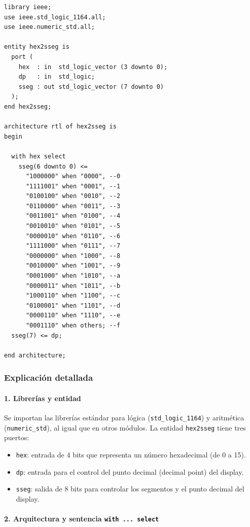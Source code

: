 \documentclass[a4paper,12pt]{article}
\begin{document}
\begin{lstlisting}[caption={Decodificador hexadecimal a 7 segmentos}, label={lst:hex2sseg}]
library ieee;
use ieee.std_logic_1164.all;
use ieee.numeric_std.all;

entity hex2sseg is
  port (
    hex  : in  std_logic_vector (3 downto 0);
    dp   : in  std_logic;
    sseg : out std_logic_vector (7 downto 0)
  );
end hex2sseg;

architecture rtl of hex2sseg is
begin

  with hex select
    sseg(6 downto 0) <=
      "1000000" when "0000", --0
      "1111001" when "0001", --1
      "0100100" when "0010", --2
      "0110000" when "0011", --3
      "0011001" when "0100", --4
      "0010010" when "0101", --5
      "0000010" when "0110", --6
      "1111000" when "0111", --7
      "0000000" when "1000", --8
      "0010000" when "1001", --9
      "0001000" when "1010", --a
      "0000011" when "1011", --b
      "1000110" when "1100", --c
      "0100001" when "1101", --d
      "0000110" when "1110", --e
      "0001110" when others; --f
  sseg(7) <= dp;

end architecture;
\end{lstlisting}

\subsubsection*{Explicación detallada}

\paragraph{1. Librerías y entidad}

Se importan las librerías estándar para lógica (\texttt{std\_logic\_1164}) y aritmética (\texttt{numeric\_std}), al igual que en otros módulos.  
La entidad \texttt{hex2sseg} tiene tres puertos:
\begin{itemize}
  \item \texttt{hex}: entrada de 4 bits que representa un número hexadecimal (de 0 a 15).
  \item \texttt{dp}: entrada para el control del punto decimal (decimal point) del display.
  \item \texttt{sseg}: salida de 8 bits para controlar los segmentos y el punto decimal del display.
\end{itemize}

\paragraph{2. Arquitectura y sentencia \texttt{with ... select}}
\end{document}
